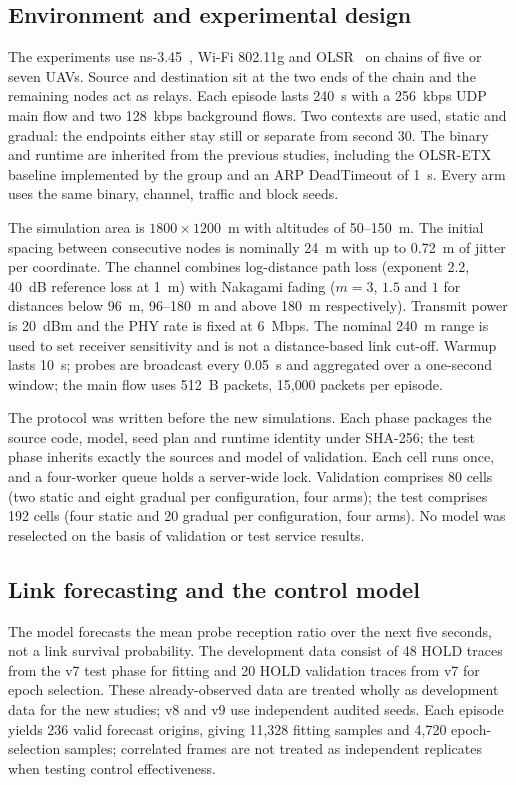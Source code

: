 \subsection{Environment and experimental design}
The experiments use ns-3.45~\cite{ns3}, Wi-Fi 802.11g and OLSR~\cite{rfc3626} on
chains of five or seven UAVs. Source and destination sit at the two ends of the
chain and the remaining nodes act as relays. Each episode lasts 240~s with a
256~kbps UDP main flow and two 128~kbps background flows. Two contexts are used,
static and gradual: the endpoints either stay still or separate from second 30.
The binary and runtime are inherited from the previous studies, including the
OLSR-ETX baseline implemented by the group and an ARP DeadTimeout of 1~s. Every
arm uses the same binary, channel, traffic and block seeds.

The simulation area is $1800\times1200$~m with altitudes of 50--150~m. The
initial spacing between consecutive nodes is nominally 24~m with up to 0.72~m of
jitter per coordinate. The channel combines log-distance path loss (exponent
2.2, 40~dB reference loss at 1~m) with Nakagami fading ($m=3$, $1.5$ and $1$ for
distances below 96~m, 96--180~m and above 180~m respectively). Transmit power is
20~dBm and the PHY rate is fixed at 6~Mbps. The nominal 240~m range is used to
set receiver sensitivity and is not a distance-based link cut-off. Warmup lasts
10~s; probes are broadcast every 0.05~s and aggregated over a one-second window;
the main flow uses 512~B packets, 15{,}000 packets per episode.

The protocol was written before the new simulations. Each phase packages the
source code, model, seed plan and runtime identity under SHA-256; the test phase
inherits exactly the sources and model of validation. Each cell runs once, and a
four-worker queue holds a server-wide lock. Validation comprises 80 cells (two
static and eight gradual per configuration, four arms); the test comprises 192
cells (four static and 20 gradual per configuration, four arms). No model was
reselected on the basis of validation or test service results.

\subsection{Link forecasting and the control model}
The model forecasts the mean probe reception ratio over the next five seconds,
not a link survival probability. The development data consist of 48 HOLD traces
from the v7 test phase for fitting and 20 HOLD validation traces from v7 for
epoch selection. These already-observed data are treated wholly as development
data for the new studies; v8 and v9 use independent audited seeds. Each episode
yields 236 valid forecast origins, giving 11{,}328 fitting samples and 4{,}720
epoch-selection samples; correlated frames are not treated as independent
replicates when testing control effectiveness.

